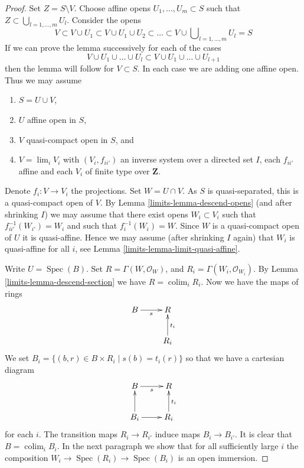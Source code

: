 \documentclass{amsart}
\theoremstyle{plain}
\theoremstyle{definition}
\theoremstyle{remark}
\numberwithin{equation}{subsection}
\def\lim{\mathop{\mathrm{lim}}\nolimits}
\def\colim{\mathop{\mathrm{colim}}\nolimits}
\def\Spec{\mathop{\mathrm{Spec}}}
\begin{document}
\begin{proof}
Set $Z = S \setminus V$. Choose affine opens $U_1, \ldots, U_m \subset S$
such that $Z \subset \bigcup_{l = 1, \ldots, m} U_l$. Consider the opens
$$
V \subset V \cup U_1 \subset V \cup U_1 \cup U_2 \subset
\ldots \subset V \cup \bigcup\nolimits_{l = 1, \ldots, m} U_l = S
$$
If we can prove the lemma successively for each of the cases
$$
V \cup U_1 \cup \ldots \cup U_l
\subset
V \cup U_1 \cup \ldots \cup U_{l + 1}
$$
then the lemma will follow for $V \subset S$. In each case we are adding
one affine open. Thus we may assume
\begin{enumerate}
\item $S = U \cup V$,
\item $U$ affine open in $S$,
\item $V$ quasi-compact open in $S$, and
\item $V = \lim_i V_i$ with $(V_i, f_{ii'})$
an inverse system over a directed set $I$, each $f_{ii'}$
affine and each $V_i$ of finite type over $\mathbf{Z}$.
\end{enumerate}
Denote $f_i : V \to V_i$ the projections.
Set $W = U \cap V$. As $S$ is quasi-separated, this is a quasi-compact open
of $V$. By Lemma \ref{limits-lemma-descend-opens}
(and after shrinking $I$) we may assume that there exist
opens $W_i \subset V_i$ such that $f_{ii'}^{-1}(W_{i'}) = W_i$
and such that $f_i^{-1}(W_i) = W$. Since $W$ is a quasi-compact open
of $U$ it is quasi-affine. Hence we may assume (after shrinking $I$ again)
that $W_i$ is quasi-affine for all $i$, see
Lemma \ref{limits-lemma-limit-quasi-affine}.

\medskip\noindent
Write $U = \Spec(B)$. Set $R = \Gamma(W, \mathcal{O}_W)$,
and $R_i = \Gamma(W_i, \mathcal{O}_{W_i})$.
By Lemma \ref{limits-lemma-descend-section} we have $R = \colim_i R_i$.
Now we have the maps of rings
$$
\xymatrix{
B \ar[r]_s & R \\
& R_i \ar[u]_{t_i}
}
$$
We set $B_i = \{(b, r) \in B \times R_i \mid s(b) = t_i(r)\}$ so that we
have a cartesian diagram
$$
\xymatrix{
B \ar[r]_s & R \\
B_i \ar[u] \ar[r] & R_i \ar[u]_{t_i}
}
$$
for each $i$. The transition maps $R_i \to R_{i'}$ induce maps
$B_i \to B_{i'}$. It is clear that $B = \colim_i B_i$.
In the next paragraph we show that for all sufficiently large $i$
the composition $W_i \to \Spec(R_i) \to \Spec(B_i)$ is an open immersion.


\end{proof}
\end{document}

